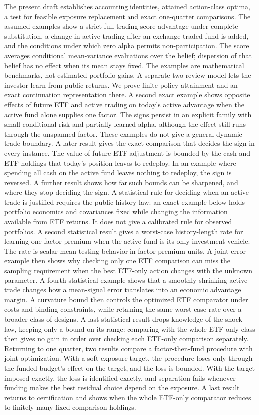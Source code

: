 \documentclass[11pt]{article}
\begin{document}
The present draft establishes accounting identities, attained
action-class optima, a test for feasible exposure replacement and
exact one-quarter comparisons. The assumed examples show a
strict full-trading score advantage under complete substitution, a
change in active trading after an exchange-traded fund is added, and
the conditions under which zero alpha permits non-participation.
The score averages conditional mean-variance evaluations over the
belief; dispersion of that belief has no effect when its mean stays
fixed. The examples are mathematical benchmarks, not estimated
portfolio gains. A separate two-review model lets the investor
learn from public returns. We prove finite policy attainment and
an exact continuation representation there. A second exact example
shows opposite effects of future ETF and active trading on today's
active advantage when the active fund alone supplies one factor.
The signs persist in an explicit family with small conditional
risk and partially learned alpha, although the effect still runs
through the unspanned factor. These examples do not give a
general dynamic trade boundary. A later result gives the exact
comparison that decides the sign in every instance. The value
of future ETF adjustment is bounded by the cash and ETF holdings
that today's position leaves to redeploy. In an example where
spending all cash on the active fund leaves nothing to redeploy,
the sign is reversed. A further result shows how far such bounds
can be sharpened, and where they stop deciding the sign. A statistical rule for
deciding when an active trade is justified requires the public
history law: an exact example below holds portfolio economics
and covariances fixed while changing the information available
from ETF returns. It does not give a calibrated rule for
observed portfolios. A second statistical result gives a
worst-case history-length rate for learning one factor premium
when the active fund is its only investment vehicle. The rate
is scalar mean-testing behavior in factor-premium units. A
joint-error example then shows why checking only one ETF
comparison can miss the sampling requirement when the best
ETF-only action changes with the unknown parameter. A fourth
statistical example shows that a smoothly shrinking active
trade changes how a mean-signal error translates into an
economic advantage margin. A curvature bound then controls
the optimized ETF comparator under costs and binding
constraints, while retaining the same worst-case rate over
a broader class of designs. A last statistical result drops
knowledge of the shock law, keeping only a bound on its
range: comparing with the whole ETF-only class then gives no
gain in order over checking each ETF-only comparison
separately. Returning to one quarter, two results compare a
factor-then-fund procedure with joint optimization. With a soft
exposure target, the procedure loses only through the funded
budget's effect on the target, and the loss is bounded. With the
target imposed exactly, the loss is identified exactly, and
separation fails whenever funding makes the best residual choice
depend on the exposure. A last result returns to certification and
shows when the whole ETF-only comparator reduces to finitely many
fixed comparison holdings.
\end{document}
